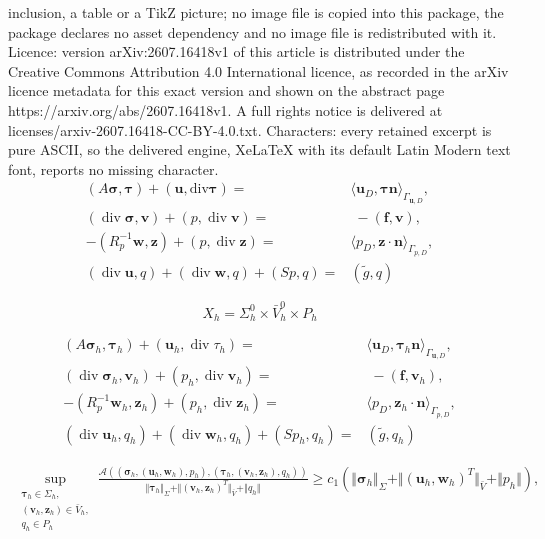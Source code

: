 \documentclass[10pt,a4paper]{amsart}
\def\bff{{\boldsymbol f}}
\def\bn{\boldsymbol n}
\def\bu{{\boldsymbol u}}
\def\bv{{\boldsymbol v}}
\def\bw{{\boldsymbol w}}
\def\bz{\boldsymbol z}
\renewcommand{\div}{\operatorname{div}}
\def\divv{\text{div}}
\def\sig{{\bm \sigma}}
\def\tbu{{\bu}}
\def\tbw{{\bw}}
\def\tp{{p}}
\def\tsig{\sig}
\begin{document}
inclusion, a table or a TikZ picture; no image file is copied into this package, the package declares no asset dependency and no image file is redistributed with it. Licence: version arXiv:2607.16418v1 of this article is distributed under the Creative Commons Attribution 4.0 International licence, as recorded in the arXiv licence metadata for this exact version and shown on the abstract page https://arxiv.org/abs/2607.16418v1. A full rights notice is delivered at licenses/arxiv-2607.16418-CC-BY-4.0.txt. Characters: every retained excerpt is pure ASCII, so the delivered engine, XeLaTeX with its default Latin Modern text font, reports no missing character.
\begin{subequations}\label{eq:Biot_weak}
\begin{align}   
(A \sig, \bm \tau) + (\bu,\divv \bm \tau) = &  \langle \bu_D, 
\bm \tau \bn \rangle_{\Gamma_{\bu,D}}, \label{eq:Biot_weak1}\\
%
(\div \bm \sigma,\bm v) + (p, \div \bv) = & \; -(\bff,\bv),  \label{eq:Biot_weak2}\\  
%
- (R_p^{-1}  \bw, \bz) + (p,\div \bz) = &
\langle p_{D}, \bz \cdot \bn \rangle_{\Gamma_{p,D}}, \label{eq:Biot_weak3} \\ 
%
(\div \bu, q) + (\div \bw, q) + (S p,q) = & (\tilde{g},q) \label{eq:Biot_weak4} 
\end{align}
\end{subequations}

\begin{equation}\label{eq:X_h}
X_h = \Sigma_h^0 \times \bar{V}_h^0 \times P_h
\end{equation}

\begin{subequations}\label{eq:Biot_fem}
\begin{align}   
(A \sig_h, \bm \tau_h) + (\bu_h,\div \tau_h) = &  \langle \bu_D, 
\bm \tau_h \bn \rangle_{\Gamma_{\bu,D}}, \label{eq:Biot_fem1}\\
%
(\div \sig_h,\bv_h) + (p_h, \div \bv_h) = & \; -(\bff,\bv_h),  \label{eq:Biot_fem2}\\  
%
- (R_p^{-1}  \bw_h, \bz_h) + (p_h,\div \bz_h) = &
\langle p_{D}, \bz_h \cdot \bn \rangle_{\Gamma_{p,D}}, \label{eq:Biot_fem3} \\ 
%
(\div \bu_h, q_h) + (\div \bw_h, q_h) + (S p_h,q_h) = & (\tilde{g},q_h) \label{eq:Biot_fem4} 
\end{align}
\end{subequations}

\begin{align}\label{inf-sup-dis}
\sup_{\substack{\bm \tau_h \in \Sigma_h, \\ (\bv_h,\bz_h)\in \bar{V}_h, \\ q_h\in P_h}}\frac{\mathcal A ((\tsig_h,(\tbu_h,\tbw_h),\tp_h),(\bm \tau_h,(\bv_h,\bz_h),q_h))}{\Vert \bm \tau_h \Vert_\Sigma + \Vert (\bv_h,\bz_h)^T \Vert_{\bar{V}} + \Vert q_h \Vert}\ge c_1 \left(\Vert \tsig_h \Vert_\Sigma + \Vert (\tbu_h,\tbw_h)^T \Vert_{\bar{V}} + \Vert \tp_h \Vert\right),
\end{align}
\end{document}
